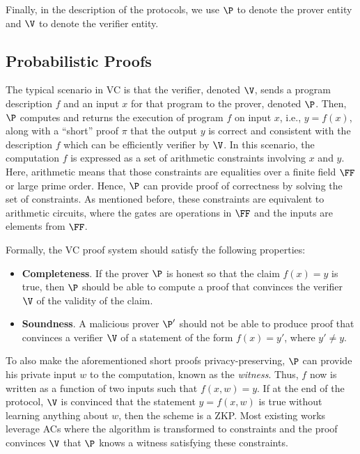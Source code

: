 Finally, in the description of the protocols, we use $\P$ to denote the prover entity and $\V$ to denote the verifier entity.

\subsection{Probabilistic Proofs}

The typical scenario in VC is that the verifier, denoted $\V$, sends a program description $f$ and an input $x$ for that program to the prover, denoted $\P$. Then, $\P$ computes and returns the execution of program $f$ on input $x$, i.e., $y = f(x)$, along with a \enquote{short} proof $\pi$ that the output $y$ is correct and consistent with the description $f$ which can be efficiently verifier by $\V$. In this scenario, the computation $f$ is expressed as a set of arithmetic constraints involving $x$ and $y$. Here, arithmetic means that those constraints are equalities over a finite field $\FF$ or large prime order. Hence, $\P$ can provide proof of correctness by solving the set of constraints. As mentioned before, these constraints are equivalent to arithmetic circuits, where the gates are operations in $\FF$ and the inputs are elements from $\FF$. 

Formally, the VC proof system should satisfy the following properties:
\begin{itemize}
    \item \textbf{Completeness}. If the prover $\P$ is honest so that the claim $f(x) = y$ is true, then $\P$ should be able to compute a proof that convinces the verifier $\V$ of the validity of the claim.
    
    \item \textbf{Soundness}. A malicious prover $\P'$ should not be able to produce proof that convinces a verifier $\V$ of a statement of the form $f(x) = y'$, where $y' \neq y$. 
\end{itemize}

To also make the aforementioned short proofs privacy-preserving, $\P$ can provide his private input $w$ to the computation, known as the \textit{witness}. Thus, $f$ now is written as a function of two inputs such that $f(x,w) = y$. If at the end of the protocol, $\V$ is convinced that the statement $y = f(x,w)$ is true without learning anything about $w$, then the scheme is a ZKP. Most existing works leverage ACs where the algorithm is transformed to constraints and the proof convinces $\V$ that $\P$ knows a witness satisfying these constraints. 

